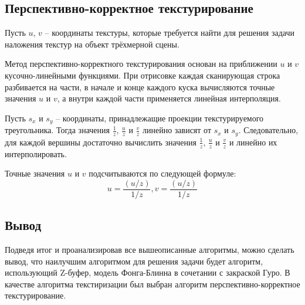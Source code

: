 \subsection{Перспективно-корректное текстурирование}

Пусть  $u$, $v$ -- координаты текстуры, которые требуется найти для решения задачи наложения текстур на объект трёхмерной сцены.

Метод перспективно-корректного текстурирования основан на приближении $u$ и $v$ кусочно-линейными функциями.
При отрисовке каждая сканирующая строка разбивается на части, в начале и конце каждого куска вычисляются точные значения
$u$ и $v$, а внутри каждой части применяется линейная интерполяция.

Пусть $s_x$ и $s_y$ -- координаты, принадлежащие проекции текстурируемого треугольника.
Тогда значения $ \frac{1}{z} $, $ \frac{u}{z} $ и $ \frac{v}{z} $ линейно зависят от $s_x$ и $s_y$.
Следовательно, для каждой вершины достаточно вычислить значения $ \frac{1}{z} $, $ \frac{u}{z} $ и $ \frac{v}{z} $ и линейно их интерполировать.

Точные значения $ u $ и $ v $ подсчитываются по следующей формуле: 
\begin{equation}
	u = \frac{(u/z)}{1/z},  v = \frac{(u/z)}{1/z} 
\end{equation}

\subsection*{Вывод}
Подведя итог и проанализировав все вышеописанные алгоритмы, можно сделать вывод, что наилучшим алгоритмом для решения задачи будет алгоритм, использующий Z-буфер, модель Фонга-Блинна в сочетании с закраской Гуро. В качестве алгоритма текстиризации был выбран алгоритм перспективно-корректное текстурирование.